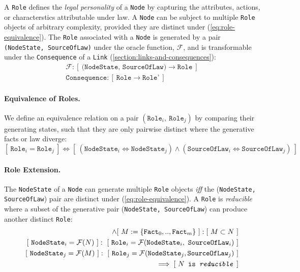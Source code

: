 \documentclass{article}
\numberwithin{equation}{section}
\begin{document}
A \texttt{Role} defines the \textit{legal personality} of a \texttt{Node} by capturing the attributes, actions, or characterstics attributable under law. A \texttt{Node} can be subject to multiple \texttt{Role} objects of arbitrary complexity, provided they are distinct under (\ref{eq:role-equivalence}). The \texttt{Role} associated with a \texttt{Node} is generated by a pair \texttt{(NodeState, SourceOfLaw)} under the oracle function, $\mathcal{F}$, and is transformable under the \texttt{Consequence} of a \texttt{Link} (\ref{section:links-and-consequences}): 
\begin{align}	
	\mathcal{F} : [ \ \texttt{(NodeState, SourceOfLaw)} \rightarrow \texttt{Role} \ ] \\
	\texttt{Consequence} : [ \ \texttt{Role} \rightarrow \texttt{Role'} \ ]
\end{align}

\paragraph{Equivalence of Roles.} We define an equivalence relation on a pair $(\texttt{Role}_i, \ \texttt{Role}_j)$ by comparing their generating states, such that they are only pairwise distinct where the generative facts or law diverge:  
\begin{equation}\label{eq:role-equivalence}
[ \ \texttt{Role}_i = \texttt{Role}_j \ ] \iff [ \ (\texttt{NodeState}_i \iff \texttt{NodeState}_j) \land (\texttt{SourceOfLaw}_i \iff \texttt{SourceOfLaw}_j) \ ]
\end{equation}

\paragraph{Role Extension.} The \texttt{NodeState} of a \texttt{Node} can generate multiple \texttt{Role} objects \textit{iff} the (\texttt{NodeState, SourceOfLaw}) pair are distinct under (\ref{eq:role-equivalence}). A \texttt{Role} is \textit{reducible} where a subset of the generative pair (\texttt{NodeState, SourceOfLaw}) can produce another distinct \texttt{Role}:
\begin{align}
	[ \ N := \{ \texttt{Fact}_0, .., \texttt{Fact}_n \} \ ] \land [ \ M := \{ \texttt{Fact}_0, .., \texttt{Fact}_m \} \ ] : [ \ M \subset N \ ] \\
	[ \ \texttt{NodeState}_i = \mathcal{F}(N) \ ] : \ [ \ \texttt{Role}_i = \mathcal{F}(\texttt{NodeState}_i, \ \texttt{SourceOfLaw}_i) \ ] \\
	[ \ \texttt{NodeState}_j = \mathcal{F}(M) \ ] : \ [ \ \texttt{Role}_j = \mathcal{F}(\texttt{NodeState}_j, \texttt{SourceOfLaw}_j) \ ] \\
	\qquad \implies [ \ \texttt{$N$ is \textit{reducible}} \ ]
\end{align}
\end{document}
